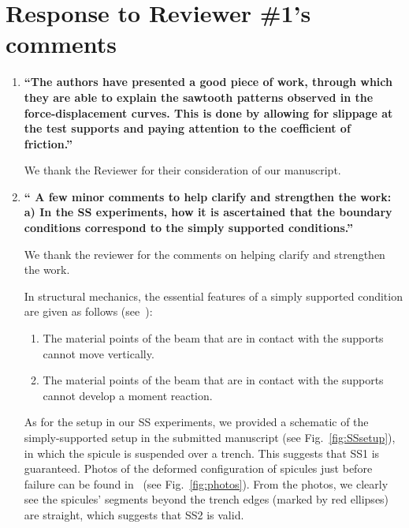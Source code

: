 \documentclass[11pt,letterpaper]{report}
\begin{document}
\clearpage
\section*{Response to Reviewer \#1's comments}
\label{rev1}

\begin{enumerate}[label=\textit{1.\arabic*},wide, labelwidth=!, labelindent=0pt]

\item \label{r1c1} {\bf ``The authors have presented a good piece of work, through which they are able to explain the sawtooth patterns observed in the force-displacement curves. This is done by allowing for slippage at the test supports and paying attention to the coefficient of friction.''}

We thank the Reviewer for their consideration of our manuscript.

\newpage
\item \label{r1c2} {\bf `` A few minor comments to help clarify and strengthen the work: a) In the SS experiments, how it is ascertained that the boundary conditions correspond to the simply supported conditions.''}

We thank the reviewer for the comments on helping clarify and strengthen the work.

In structural mechanics, the essential features of a simply supported condition are given as follows (see~\citet{gere1997mechanics}):
\begin{enumerate}[label=\textit{(SS\arabic*).},leftmargin = 1.5 cm]
\item The material points of the beam that are in contact with the supports cannot move vertically.
\item The material points of the beam that are in contact with the supports cannot develop a moment reaction.
\end{enumerate}


As for the setup in our SS experiments, we provided a schematic of the simply-supported setup in the submitted manuscript (see Fig.~\ref{fig:SSsetup}), in which the spicule is suspended over a trench. This suggests that SS1 is guaranteed. Photos of the deformed configuration of spicules just before failure can be found in~\citet{monn2017enhanced} (see Fig.~\ref{fig:photos}). From the photos, we clearly see the spicules' segments beyond the trench edges (marked by red ellipses) are straight, which suggests that SS2 is valid.


\end{enumerate}
\end{document}
